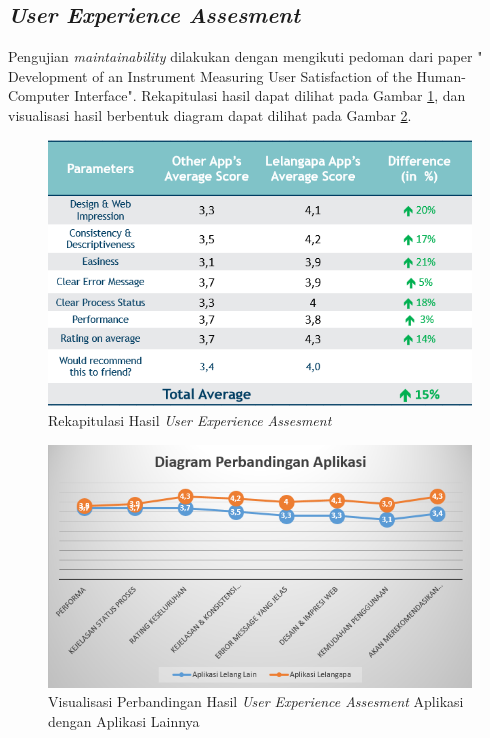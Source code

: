 \subsection{\textit{User Experience Assesment}}
Pengujian \textit{maintainability} dilakukan dengan mengikuti pedoman dari paper " Development of an Instrument Measuring User Satisfaction of the Human-Computer Interface"\cite{chin_development_1998}. Rekapitulasi hasil dapat dilihat pada Gambar \ref{ux-recap}, dan visualisasi hasil berbentuk diagram dapat dilihat pada Gambar \ref{ux-chart}.
\begin{figure}[h!]
	\centering
	\includegraphics[width=.45\textwidth]{images/bab5/ujipengguna/result.png}
	\caption{Rekapitulasi Hasil \textit{User Experience Assesment}}
	\label{ux-recap}
\end{figure}
\begin{figure}[h!]
	\centering
	\includegraphics[width=.45\textwidth]{images/bab5/ujipengguna/chart.png}
	\caption{Visualisasi Perbandingan Hasil \textit{User Experience Assesment} Aplikasi dengan Aplikasi Lainnya}
	\label{ux-chart}
\end{figure}